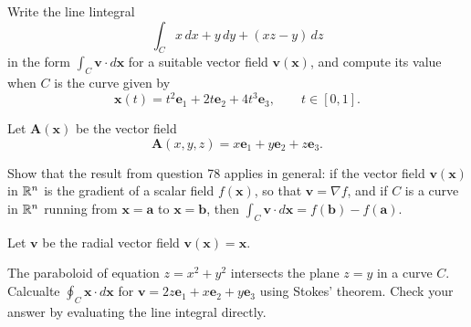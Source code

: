 
\question Write the line lintegral
\[
    \int_C x\,dx + y\,dy + (xz - y)\,dz
\]
in the form $\int_C \bm v \cdot d\bm x$ for a suitable vector field $\bm v(\bm x)$,
and compute its value when $C$ is the curve given by 
\[
    \bm x(t) = t^2 \bm e_1 + 2t \bm e_2 + 4t^3 \bm e_3, \qquad t \in [0,1].
\]

\question Let $\bm A(\bm x)$ be the vector field
\[
    \bm A(x,y,z) = x\bm e_1 + y\bm e_2 + z\bm e_3.
\]

\question Show that the result from question 78 applies in general: if the vector field $\bm v(\bm x)$
in $\mathbb{R}^n$ is the gradient of a scalar field $f(\bm x)$, so that $\bm v = \nabla f$,
and if $C$ is a curve in $\mathbb{R}^n$ running from $\bm x = \bm a$ to $\bm x = \bm b$,
then $\int_C \bm v \cdot d\bm x = f(\bm b) - f(\bm a)$.

\question Let $\bm v$ be the radial vector field $\bm v(\bm x) = \bm x$.

\question The paraboloid of equation $z = x^2 + y^2$ intersects the plane $z = y$ in a curve $C$.
Calcualte 
$\oint_C \bm x \cdot d\bm x$ 
for 
$\bm v = 2z \bm e_1 + x \bm e_2 + y \bm e_3$ 
using Stokes' theorem.
Check your answer by evaluating the line integral directly.
